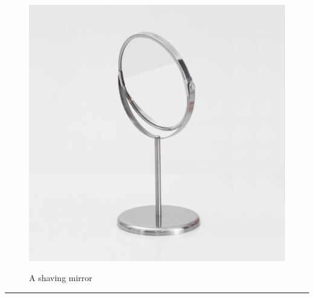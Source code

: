 \documentclass{article}
\begin{document}
    \begin{figure}[H]
        \centering
        \begin{minipage}{0.25\textwidth}
            \centering
            \includegraphics[width=\textwidth]{../SurvivalItemImages/mirror}
        \end{minipage}\hfill
        \begin{minipage}{0.7\textwidth}
            \centering
            \Large A shaving mirror
        \end{minipage}
    \end{figure}
    \vspace{-0.8em}
    \noindent\rule{\textwidth}{0.4pt}
            
\end{document}
